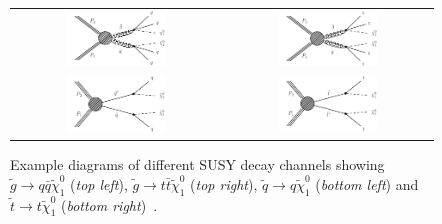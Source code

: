 \begin{figure}[!t]
  \centering
      \begin{tabular}{cc}
       \includegraphics[width=0.49\textwidth]{figures/T1qqqq.pdf}  &
       \includegraphics[width=0.49\textwidth]{figures/T1tttt_feyn.pdf} \\
       \includegraphics[width=0.49\textwidth]{figures/T2qq.pdf} &
       \includegraphics[width=0.49\textwidth]{figures/T2tt_v2.pdf} 
      \end{tabular}
  \caption{Example diagrams of different SUSY decay channels showing $\tilde{g} \rightarrow q\bar{q} \tilde{\chi}_1^0$ (\textit{top left}), $\tilde{g} \rightarrow t\bar{t}\tilde{\chi}_1^0$ (\textit{top right}), $\tilde{q} \rightarrow q\tilde{\chi}_1^0$ (\textit{bottom left}) and $\tilde{t} \rightarrow t\tilde{\chi}_1^0$ (\textit{bottom right})~\cite{bib:CMS:PhysicsResultsSUS}.}
  \label{fig:susy_decay}
\end{figure}


